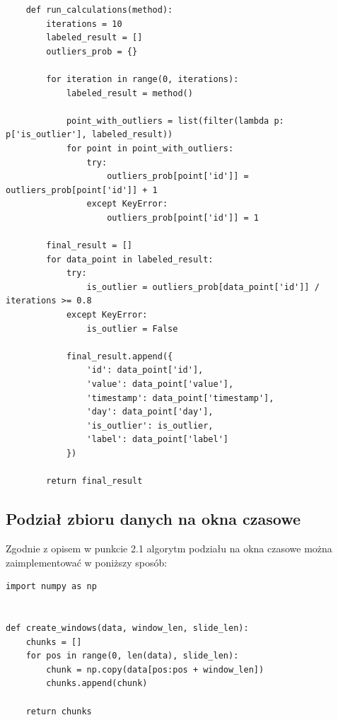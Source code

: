 \documentclass[eng,printmode]{mgr}
\begin{document}
\begin{lstlisting}
    def run_calculations(method):
        iterations = 10
        labeled_result = []
        outliers_prob = {}

        for iteration in range(0, iterations):
            labeled_result = method()

            point_with_outliers = list(filter(lambda p: p['is_outlier'], labeled_result))
            for point in point_with_outliers:
                try:
                    outliers_prob[point['id']] = outliers_prob[point['id']] + 1
                except KeyError:
                    outliers_prob[point['id']] = 1

        final_result = []
        for data_point in labeled_result:
            try:
                is_outlier = outliers_prob[data_point['id']] / iterations >= 0.8
            except KeyError:
                is_outlier = False

            final_result.append({
                'id': data_point['id'],
                'value': data_point['value'],
                'timestamp': data_point['timestamp'],
                'day': data_point['day'],
                'is_outlier': is_outlier,
                'label': data_point['label']
            })

        return final_result
\end{lstlisting}


\subsection{Podział zbioru danych na okna czasowe}
Zgodnie z opisem w punkcie 2.1 algorytm podziału na okna czasowe można zaimplementować w poniższy sposób:
\begin{lstlisting}
import numpy as np


def create_windows(data, window_len, slide_len):
    chunks = []
    for pos in range(0, len(data), slide_len):
        chunk = np.copy(data[pos:pos + window_len])
        chunks.append(chunk)

    return chunks
\end{lstlisting}
\end{document}
